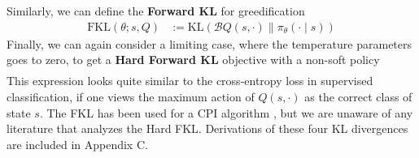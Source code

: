 \documentclass[twoside,11pt]{article}
\DeclareMathOperator*{\argmax}{arg\,max}
\newcommand{\R}{\mathbb{R}}
\newcommand{\statespace}{\mathcal{S}}
\newcommand{\actionspace}{\mathcal{A}}
\newcommand{\Qhat}{{Q}}
\newcommand{\KL}{\mathrm{KL}}
\newcommand{\policyparams}{\theta}
\newcommand{\boltzmannQ}{\mathcal{B}Q}
\newcommand{\entropy}{\mathcal{H}}
\newcommand{\defeq}{:=}
\begin{document}
Similarly, we can define the \textbf{Forward KL} for greedification %
%
\begin{align}
\text{FKL}(\policyparams; s, \Qhat) &\defeq  %
    \KL\left(\boltzmannQ(s, \cdot)  \parallel \pi_\policyparams(\cdot \mid s) \right)\nonumber%
\end{align}
%
%
%
Finally, we can again consider a limiting case, where the temperature parameters goes to zero, to get a \textbf{Hard Forward KL} objective with a non-soft policy
%
\begin{align}
\end{align}
%
This expression looks quite similar to the cross-entropy loss in supervised classification, if one views the maximum action of $Q(s, \cdot)$ as the correct class of state $s$. The FKL has been used for a CPI algorithm \citep{vieillard2019deep}, but we are unaware of any literature that analyzes the Hard FKL. Derivations of these four KL divergences are included in Appendix C.
\end{document}
